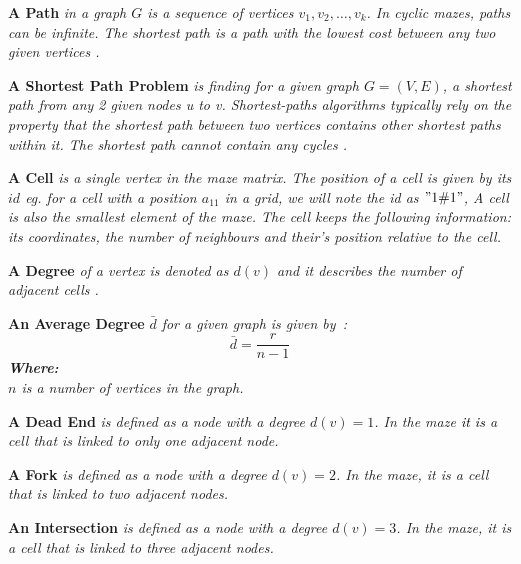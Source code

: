 \begin{definition}\textbf{A Path } \emph{in a graph $G$ is a sequence of vertices $v_1, v_2,\ldots,v_k$. In cyclic mazes, paths can be infinite. The shortest path is a path with the lowest cost between any two given vertices \cite{9}.}\end{definition}
\begin{definition}\textbf{A Shortest Path Problem } \emph{is finding for a given graph $G = (V,E)$, a shortest path from any 2 given nodes \textit{u} to \textit{v}. Shortest-paths algorithms typically rely on the property that the shortest path between two vertices contains other shortest paths within it.
The shortest path cannot contain any cycles \cite{5}.}\end{definition}
\begin{definition}\textbf{A Cell} \emph{is a single vertex in the maze matrix. The position of a cell is given by its $id$ eg. for a cell with a position $a_{11}$ in a grid, we will note the id as $"1\char"0023 1"$, A cell is also the smallest element of the maze. The cell keeps the following information: its coordinates, the number of neighbours and their’s position relative to the cell.}\end{definition}
\begin{definition}\textbf{A Degree } \emph{of a vertex is denoted as $d(v)$ and it describes the number of adjacent cells \cite{10}.}\end{definition}
\begin{definition}\textbf{An Average Degree }\emph{ $\bar{d}$ for a given graph is given by~\cite{10}:\\
\begin{equation}
\bar{d} = \frac{r}{n-1}	
\end{equation}
\textbf{Where:}\\
$n$ is a number of vertices in the graph.\\	
}\end{definition}
\begin{definition}\textbf{A Dead End} \emph{ is defined as a node with a degree $d(v) = 1$. In the maze \textcolor{black}{it is} a cell that is linked to only one adjacent node.}\end{definition}
\begin{definition}\textbf{A Fork} \emph{is defined as a node with a degree $d(v) = 2$. In the maze, it is a cell that is linked to two adjacent nodes.}\end{definition}
\begin{definition}\textbf{An Intersection} \emph{ is defined as a node with a degree $d(v) = 3$. In the maze, it is a cell that is linked to three adjacent nodes.}\end{definition}
